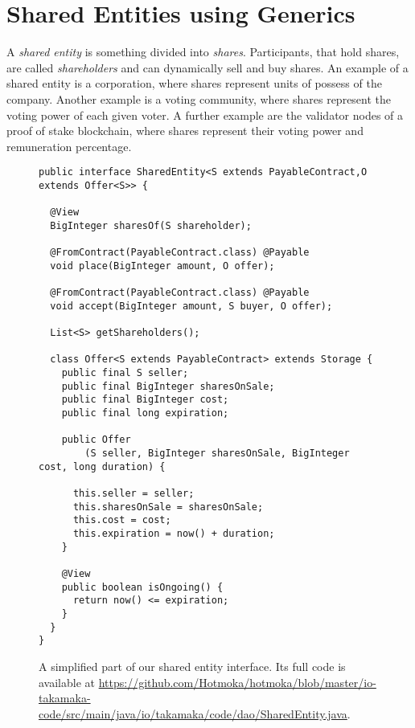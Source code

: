 \section{Shared Entities using Generics}\label{sec:shared_entities}

A \emph{shared entity} is something divided into \emph{shares}. Participants,
that hold shares, are called \emph{shareholders} and can dynamically
sell and buy shares. An example of a shared entity is a corporation,
where shares represent units of possess of the company. Another example is
a voting community, where shares represent the voting power of each given voter.
A further example are the validator nodes of a proof of stake blockchain,
where shares represent their voting power and remuneration percentage.

\begin{figure}[t]
  \begin{center}
    \begin{lstlisting}[language=Takamaka]
public interface SharedEntity<S extends PayableContract,O extends Offer<S>> {

  @View
  BigInteger sharesOf(S shareholder);

  @FromContract(PayableContract.class) @Payable
  void place(BigInteger amount, O offer);

  @FromContract(PayableContract.class) @Payable
  void accept(BigInteger amount, S buyer, O offer);

  List<S> getShareholders();

  class Offer<S extends PayableContract> extends Storage {
    public final S seller;
    public final BigInteger sharesOnSale;
    public final BigInteger cost;
    public final long expiration;

    public Offer
        (S seller, BigInteger sharesOnSale, BigInteger cost, long duration) {

      this.seller = seller;
      this.sharesOnSale = sharesOnSale;
      this.cost = cost;
      this.expiration = now() + duration;
    }

    @View
    public boolean isOngoing() {
      return now() <= expiration;
    }
  }
}
    \end{lstlisting}
  \end{center}
  \caption{A simplified part of our shared entity interface.
  Its full code is available at \url{https://github.com/Hotmoka/hotmoka/blob/master/io-takamaka-code/src/main/java/io/takamaka/code/dao/SharedEntity.java}.}\label{fig:shared_entity}
\end{figure}

